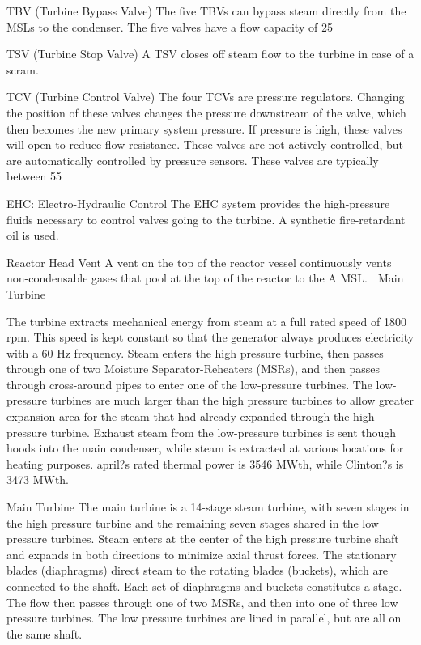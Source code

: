 \documentclass[10pt]{article}
\begin{document}
TBV (Turbine Bypass Valve)
The five TBVs can bypass steam directly from the MSLs to the condenser. The five valves have a flow capacity of 25%

TSV (Turbine Stop Valve)
A TSV closes off steam flow to the turbine in case of a scram. 

TCV (Turbine Control Valve)
The four TCVs are pressure regulators. Changing the position of these valves changes the pressure downstream of the valve, which then becomes the new primary system pressure. If pressure is high, these valves will open to reduce flow resistance. These valves are not actively controlled, but are automatically controlled by pressure sensors. These valves are typically between 55%

EHC: Electro-Hydraulic Control
The EHC system provides the high-pressure fluids necessary to control valves going to the turbine. A synthetic fire-retardant oil is used. 

Reactor Head Vent
A vent on the top of the reactor vessel continuously vents non-condensable gases that pool at the top of the reactor to the A MSL. 
Main Turbine

The turbine extracts mechanical energy from steam at a full rated speed of 1800 rpm. This speed is kept constant so that the generator always produces electricity with a 60 Hz frequency. Steam enters the high pressure turbine, then passes through one of two Moisture Separator-Reheaters (MSRs), and then passes through cross-around pipes to enter one of the low-pressure turbines. The low-pressure turbines are much larger than the high pressure turbines to allow greater expansion area for the steam that had already expanded through the high pressure turbine. Exhaust steam from the low-pressure turbines is sent though hoods into the main condenser, while steam is extracted at various locations for heating purposes. april?s rated thermal power is 3546 MWth, while Clinton?s is 3473 MWth.

Main Turbine
The main turbine is a 14-stage steam turbine, with seven stages in the high pressure turbine and the remaining seven stages shared in the low pressure turbines. Steam enters at the center of the high pressure turbine shaft and expands in both directions to minimize axial thrust forces. The stationary blades (diaphragms) direct steam to the rotating blades (buckets), which are connected to the shaft. Each set of diaphragms and buckets constitutes a stage. The flow then passes through one of two MSRs, and then into one of three low pressure turbines. The low pressure turbines are lined in parallel, but are all on the same shaft. 
\end{document}

